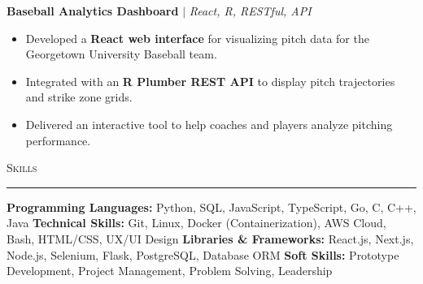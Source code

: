 \documentclass[11pt,letterpaper]{article}
\begin{document}
\begin{list}{}{\setlength{\leftmargin}{1em}\setlength{\rightmargin}{2pt}}
    \item
          \textbf{Baseball Analytics Dashboard} $|$ \small{\textit{React, R, RESTful, API}} \hfill \small{\textit{}}
          \begin{itemize}[itemsep=-5pt, topsep=-2pt]
              \item Developed a \textbf{React web interface} for visualizing pitch data for the Georgetown University Baseball team.
              \item Integrated with an \textbf{R Plumber REST API} to display pitch trajectories and strike zone grids.
              \item Delivered an interactive tool to help coaches and players analyze pitching performance.
          \end{itemize}
\end{list}



\vspace{4pt}
\textsc{\large{Skills}} 
\vspace{4pt}
\hrule
\begin{list}{}{\setlength{\leftmargin}{1em}\setlength{\rightmargin}{2pt}}
  
    \item
          \small{\textbf{Programming Languages:} Python, SQL, JavaScript, TypeScript, Go, C, C++, Java}
          \vspace{2pt} \newline
          \small{\textbf{Technical Skills:} Git, Linux, Docker (Containerization), AWS Cloud, Bash, HTML/CSS, UX/UI Design}
          \vspace{2pt} \newline
          \small{\textbf{Libraries \& Frameworks:} React.js, Next.js, Node.js, Selenium, Flask, PostgreSQL, Database ORM}
          \vspace{2pt} \newline
          \small{\textbf{Soft Skills:} Prototype Development, Project Management, Problem Solving, Leadership}
          \vspace{0pt}
\end{list}
\end{document}
